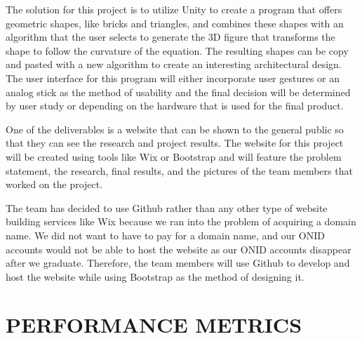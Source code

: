 \documentclass[letterpaper,draftclsnofoot,onecolumn,10 pt]{IEEEtran}
\begin{document}
The solution for this project is to utilize Unity to create a program that offers geometric shapes, like bricks and triangles, and combines these shapes with an algorithm that the user selects to generate the 3D figure that transforms the shape to follow the curvature of the equation. The resulting shapes can be copy and pasted with a new algorithm to create an interesting architectural design. The user interface for this program will either incorporate user gestures or an analog stick as the method of usability and the final decision will be determined by user study or depending on the hardware that is used for the final product. \par
One of the deliverables is a website that can be shown to the general public so that they can see the research and project results. The website for this project will be created using tools like Wix or Bootstrap and will feature the problem statement, the research, final results, and the pictures of the team members that worked on the project. \par
The team has decided to use Github rather than  any other type of website building services like Wix because we ran into the problem of acquiring a domain name. We did not want to have to pay for a domain name, and our ONID accounts would not be able to host the website as our ONID accounts disappear after we graduate. Therefore, the team members will use Github to develop and host the website while using Bootstrap as the method of designing it. 


\section{PERFORMANCE METRICS}
\end{document}
